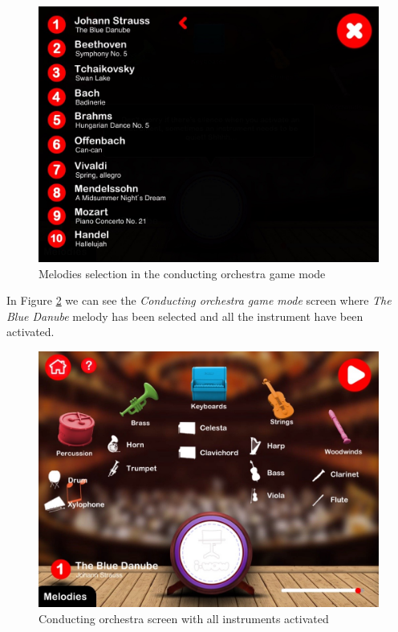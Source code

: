 \begin{figure}[ht!]
	\centering
	\includegraphics[width=400pt]{graphics/use-case/conducting_melodies_screen.jpg}
	\caption{Melodies selection in the conducting orchestra game mode}
	\label{fig:conducting_melodies_screen}
\end{figure}

\FloatBarrier

In Figure \ref{fig:conducting_all_stop_screen} we can see the \textit{Conducting orchestra game mode} screen where \textit{The Blue Danube} melody has been selected and all the instrument have been activated.

\begin{figure}[ht!]
	\centering
	\includegraphics[width=400pt]{graphics/use-case/conducting_all_stop_screen.jpg}
	\caption{Conducting orchestra screen with all instruments activated}
	\label{fig:conducting_all_stop_screen}
\end{figure}

